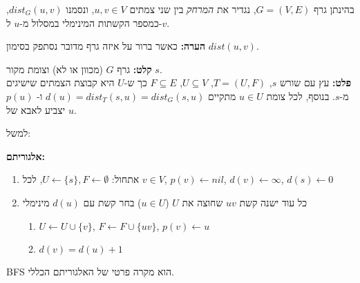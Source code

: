 \begin{definition}[מרחק]
בהינתן גרף 
$G = (V, E)$,
נגדיר את 
\emph{המרחק}
בין שני צמתים 
$u,v \in V$,
ונסמנו 
$dist_G(u,v)$,
כמספר הקשתות המינימלי במסלול מ-$u$ ל-$v$.
\end{definition}

\textbf{הערה:}
כאשר ברור על איזה גרף מדובר נסתפק בסימון 
$dist(u,v)$.

\vspace{5mm}
\textbf{קלט:}
גרף $G$ (מכוון או לא) וצומת מקור $s$.
\\
\textbf{פלט:}
עץ עם שורש $s$,
$T = (U, F)$, 
$U \subseteq V$, 
$F \subseteq E$
כך ש-$U$ היא קבוצת הצמתים שישיגים מ-$s$.
בנוסף, לכל צומת 
$u \in U$
מתקיים
$d(u) = dist_T(s, u) = dist_G(s, u)$
ו-%
$p(u)$
יצביע לאבא של 
$u$.

למשל:
\begin{center}
\end{center}

\textbf{אלגוריתם:}
\begin{enumerate}
\item
אתחול:
$U \leftarrow \{s\}, F \leftarrow \emptyset$, 
לכל 
$v \in V$,
$p(v) \leftarrow nil$,
$d(v) \leftarrow \infty$,
$d(s) \leftarrow 0$
\item 
\label{item:bfs:while}
כל עוד ישנה קשת 
$uv$
שחוצה את $U$ 
($u \in U$)
בחר קשת עם 
$d(u)$
מינימלי
	\begin{enumerate}
	\item
	$U \leftarrow U \cup \{v\}$,
	$F \leftarrow F \cup \{uv\}$,
	$p(v) \leftarrow u$
	\item
	$d(v) = d(u) + 1$
	\end{enumerate}
\end{enumerate}
BFS
הוא מקרה פרטי של האלגוריתם הכללי.

